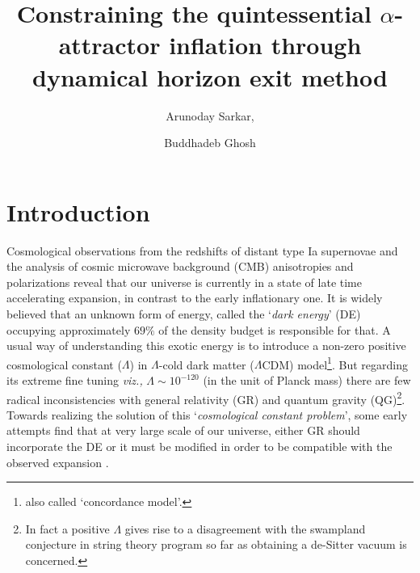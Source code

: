 \documentclass[a4paper,11pt]{article}
\title{\boldmath Constraining the quintessential \texorpdfstring{$\alpha$}{a}-attractor inflation through dynamical horizon exit method}
\author{Arunoday Sarkar,}%
\author{Buddhadeb Ghosh}
\affiliation{Centre of Advanced Studies, Department of Physics, The University of Burdwan,\\Burdwan 713 104, India}
\begin{document}
 
\maketitle
\flushbottom


\section{Introduction}
\label{sec:intro}
Cosmological observations \cite{SupernovaSearchTeam:1998fmf,SupernovaCosmologyProject:1998vns} from the redshifts of distant type Ia supernovae and the analysis of cosmic microwave background (CMB) anisotropies and polarizations \cite{WMAP:2012nax,Planck:2015fie,Planck:2018vyg,BICEP2:2015xme} reveal that our universe is currently in a state of late time accelerating expansion, in contrast to the early inflationary one. It is widely believed that an unknown form of energy, called the `\textit{dark energy}' (DE) \cite{Huterer:1998qv} occupying \cite{Planck:2018vyg} approximately $69\%$ of the density budget is responsible for that. A usual way of understanding this exotic energy is to introduce a non-zero positive cosmological constant ($\Lambda$) in $\Lambda$-cold dark matter ($\Lambda$CDM) model\footnote{also called `concordance model'.}. But regarding its extreme fine tuning \textit{viz.,} $\Lambda\sim 10^{-120}$ (in the unit of Planck mass) there are few radical inconsistencies with general relativity (GR) and quantum gravity (QG)\footnote{In fact a positive $\Lambda$ gives rise to a disagreement with the swampland conjecture \cite{Vafa:2005ui,Obied:2018sgi,Agrawal:2018own,Roupec:2018mbn,Akrami:2018ylq,Kehagias:2018uem} in string theory program so far as obtaining a de-Sitter vacuum is concerned.}\cite{Dimopoulos:2022wzo}. Towards realizing the solution of this `\textit{cosmological constant problem}', some early attempts find that at very large scale of our universe, either GR should incorporate the DE \cite{Copeland:2006wr} or it must be modified in order to be compatible with the observed expansion \cite{Clifton:2011jh}.\par 
\end{document}
